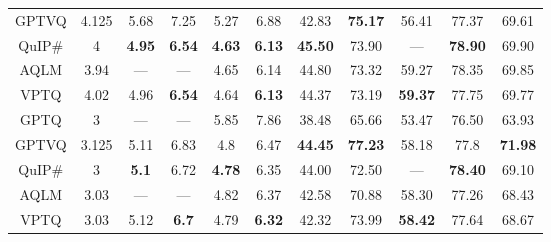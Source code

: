 \begin{table}[hbt!]
{\begin{tabular}{c|c|cccc|ccccc}
GPTVQ                & 4.125                & 5.68                    & 7.25                    & 5.27                    & 6.88                    & 42.83               & \textbf{75.17}      & 56.41               & 77.37               & 69.61               \\
QuIP\#               & 4                    & \textbf{4.95}           & \textbf{6.54}           & \textbf{4.63}           & \textbf{6.13}           & \textbf{45.50}      & 73.90               & ---                 & \textbf{78.90}      & 69.90               \\
AQLM                 & 3.94                 & ---                     & ---                     & 4.65                    & 6.14                    & 44.80               & 73.32               & 59.27               & 78.35               & 69.85               \\
VPTQ                 & 4.02                 & 4.96                    & \textbf{6.54}           & 4.64                    & \textbf{6.13}           & 44.37               & 73.19               & \textbf{59.37}      & 77.75               & 69.77               \\ \hline
GPTQ                 & 3                    & ---                     & ---                     & 5.85                    & 7.86                    & 38.48               & 65.66               & 53.47               & 76.50               & 63.93               \\
GPTVQ                & 3.125                & 5.11                    & 6.83                    & 4.8                     & 6.47                    & \textbf{44.45}      & \textbf{77.23}      & 58.18               & 77.8                & \textbf{71.98}      \\
QuIP\#               & 3                    & \textbf{5.1}            & 6.72                    & \textbf{4.78}           & 6.35                    & 44.00               & 72.50               & ---                 & \textbf{78.40}      & 69.10               \\
AQLM                 & 3.03                 & ---                     & ---                     & 4.82                    & 6.37                    & 42.58               & 70.88               & 58.30               & 77.26               & 68.43               \\
VPTQ                 & 3.03                 & 5.12                    & \textbf{6.7}            & 4.79                    & \textbf{6.32}           & 42.32               & 73.99               & \textbf{58.42}      & 77.64               & 68.67               \\ \hline

\end{tabular}}
\end{table}
